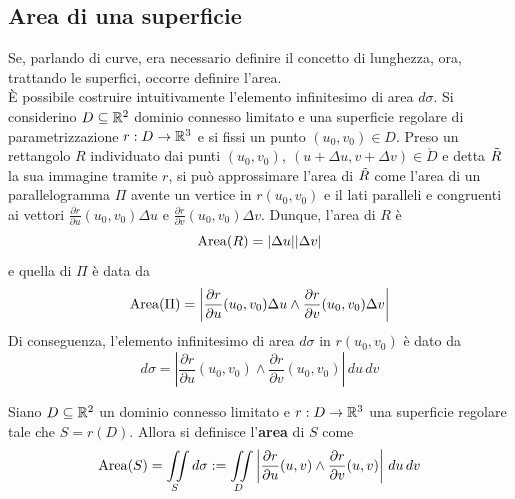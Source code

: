 \subsection{Area di una superficie}
Se, parlando di curve, era necessario definire il concetto di lunghezza, ora, trattando le superfici, occorre definire l'area.\\
È possibile costruire intuitivamente l'elemento infinitesimo di area $d \sigma$. Si considerino $D \subseteq \mathbb{R}^2$ dominio connesso limitato e una superficie regolare di parametrizzazione $r: D \to \mathbb{R}^3$ e si fissi un punto $(u_0, v_0) \in D$. Preso un rettangolo $R$ individuato dai punti $(u_0, v_0),\ (u+ \Delta u, v + \Delta v) \in \mathring{D}$ e detta $\Tilde{R}$  la sua immagine tramite $r$, si può approssimare l'area di $\Tilde{R}$ come l'area di un parallelogramma $\Pi$ avente un vertice in $r(u_0,v_0)$ e il lati paralleli e congruenti ai vettori $\tfrac{\partial r}{\partial u} (u_0,v_0) \Delta u$ e $\tfrac{\partial r}{\partial v}(u_0,v_0) \Delta v$. Dunque, l'area di $R$ è
\begin{equation}
\operatorname{Area}(R)=|\Delta u||\Delta v|    
\end{equation}
 e quella di $\Pi$ è data da
 \begin{equation}
 \operatorname{Area}(\Pi)= \left|\frac{\partial r}{\partial u} (u_0,v_0) \Delta u \wedge \frac{\partial r}{\partial v}(u_0,v_0) \Delta v \right|
 \end{equation}
 Di conseguenza, l'elemento infinitesimo di area $d \sigma$ in $r(u_0, v_0)$ è dato da
 \begin{equation}
     d\sigma= \left|\frac{\partial r}{\partial u} (u_0,v_0) \wedge \frac{\partial r}{\partial v}(u_0,v_0) \right|\, du\, dv
 \end{equation}
 \begin{definition} \label{Def: Area di una superficie}
     Siano $D \subseteq \mathbb{R}^2$ un dominio connesso limitato e $r: D \to \mathbb{R}^3$ una superficie regolare tale che $S=r(D)$. Allora si definisce l'\textbf{area} di $S$ come
     \begin{equation}
         \operatorname{Area}(S)= \iint\limits_{S}{d\sigma} := \iint\limits_{D}{\left|\frac{\partial r}{\partial u} (u,v) \wedge \frac{\partial r}{\partial v}(u,v) \right|\, du\, dv}
     \end{equation}
 \end{definition}
